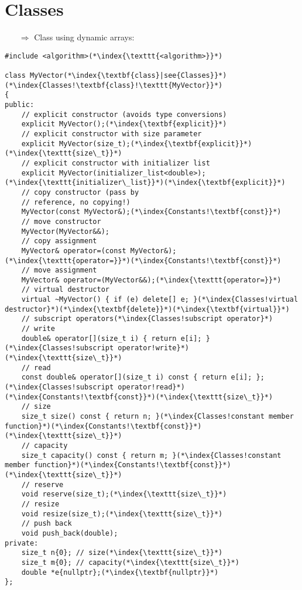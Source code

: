 \documentclass[10pt]{article}
\begin{document}
\section{Classes}
\small
\begin{enumerate}
\item[$\Rightarrow$] Class using dynamic arrays:
\end{enumerate}
\begin{lstlisting}
#include <algorithm>(*\index{\texttt{<algorithm>}}*)

class MyVector(*\index{\textbf{class}|see{Classes}}*)(*\index{Classes!\textbf{class}!\texttt{MyVector}}*)
{
public:
    // explicit constructor (avoids type conversions)
    explicit MyVector();(*\index{\textbf{explicit}}*)
    // explicit constructor with size parameter
    explicit MyVector(size_t);(*\index{\textbf{explicit}}*)(*\index{\texttt{size\_t}}*)
    // explicit constructor with initializer list
    explicit MyVector(initializer_list<double>);(*\index{\texttt{initializer\_list}}*)(*\index{\textbf{explicit}}*)
    // copy constructor (pass by
    // reference, no copying!)
    MyVector(const MyVector&);(*\index{Constants!\textbf{const}}*)
    // move constructor
    MyVector(MyVector&&);
    // copy assignment
    MyVector& operator=(const MyVector&);(*\index{\texttt{operator=}}*)(*\index{Constants!\textbf{const}}*)
    // move assignment
    MyVector& operator=(MyVector&&);(*\index{\texttt{operator=}}*)
    // virtual destructor
    virtual ~MyVector() { if (e) delete[] e; }(*\index{Classes!virtual destructor}*)(*\index{\textbf{delete}}*)(*\index{\textbf{virtual}}*)
    // subscript operators(*\index{Classes!subscript operator}*)
    // write
    double& operator[](size_t i) { return e[i]; }(*\index{Classes!subscript operator!write}*)(*\index{\texttt{size\_t}}*)
    // read
    const double& operator[](size_t i) const { return e[i]; };(*\index{Classes!subscript operator!read}*)(*\index{Constants!\textbf{const}}*)(*\index{\texttt{size\_t}}*)
    // size
    size_t size() const { return n; }(*\index{Classes!constant member function}*)(*\index{Constants!\textbf{const}}*)(*\index{\texttt{size\_t}}*)
    // capacity
    size_t capacity() const { return m; }(*\index{Classes!constant member function}*)(*\index{Constants!\textbf{const}}*)(*\index{\texttt{size\_t}}*)
    // reserve
    void reserve(size_t);(*\index{\texttt{size\_t}}*)
    // resize
    void resize(size_t);(*\index{\texttt{size\_t}}*)
    // push back
    void push_back(double);
private:
    size_t n{0}; // size(*\index{\texttt{size\_t}}*)
    size_t m{0}; // capacity(*\index{\texttt{size\_t}}*)
    double *e{nullptr};(*\index{\textbf{nullptr}}*)
};
\end{lstlisting}
\end{document}
